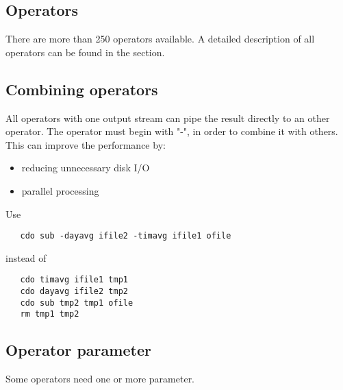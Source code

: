 \subsection{Operators}

There are more than 250 operators available.
A detailed description of all operators can be found in the
{\bf {}} section.


\subsection{Combining operators}

All operators with one output stream can pipe the result
directly to an other operator.
The operator must begin with "-", in order to combine it with others.
This can improve the performance by:
\begin{itemize}
\item reducing unnecessary disk I/O
\item parallel processing
\end{itemize}
Use
\begin{verbatim}
   cdo sub -dayavg ifile2 -timavg ifile1 ofile
\end{verbatim}
instead of
\begin{verbatim}
   cdo timavg ifile1 tmp1
   cdo dayavg ifile2 tmp2
   cdo sub tmp2 tmp1 ofile
   rm tmp1 tmp2
\end{verbatim}


\subsection{Operator parameter}

Some operators need one or more parameter.

